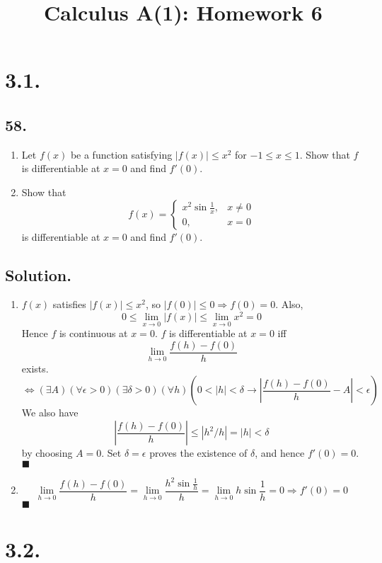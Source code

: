 \documentclass{article}
\title{Calculus A(1): Homework 6}
\begin{document}
\maketitle
\section*{3.1.}
\subsection*{58.}
\begin{enumerate} [label=\textbf{\alph*.}]
    \item Let $f(x)$ be a function satisfying $|f(x)|\leq x^2$ for $-1\leq x\leq 1$. Show that $f$ is differentiable at $x=0$ and find $f'(0)$.
    \item Show that
    \[f(x)=\left\{\begin{array}{ll}
       x^2\sin{\frac{1}{x}}, & x\neq 0 \\
       0,  & x=0
    \end{array}\right.\]
    is differentiable at $x=0$ and find $f'(0)$.
\end{enumerate}
\subsection*{Solution.}
\begin{enumerate} [label=\textbf{\alph*.}]
    \item 
    $f(x)$ satisfies $|f(x)|\leq x^2$, so $|f(0)|\leq 0\Rightarrow f(0)=0$.
    Also, \[0\leq \lim_{x\to 0}|f(x)|\leq \lim_{x\to 0}x^2=0\]
    Hence $f$ is continuous at $x=0$.
    $f$ is differentiable at $x=0$ iff \[\lim_{h\to 0} \frac{f(h)-f(0)}{h}\] exists.
    \[\Leftrightarrow (\exists A)(\forall \epsilon>0)(\exists \delta>0)(\forall h)(0<|h|<\delta\rightarrow\left\vert\frac{f(h)-f(0)}{h}-A\right\vert<\epsilon)\]
    We also have
    \[\left\vert\frac{f(h)-f(0)}{h}\right\vert\leq|h^2/h|=|h|<\delta\]
    by choosing $A=0$. Set $\delta =\epsilon$ proves the existence of $\delta$, and hence $f'(0)=0$.  $\blacksquare$
    \item 
    \[\lim _{h\to 0}\frac{f(h)-f(0)}{h}=\lim _{h\to 0}\frac{h^2\sin{\frac{1}{h}}}{h}=\lim _{h\to 0} h\sin{\frac{1}{h}}=0\Rightarrow f'(0)=0\]
    $\blacksquare$
\end{enumerate}
\section*{3.2.}
\end{document}
